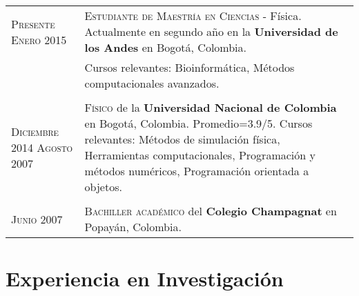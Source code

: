 \documentclass[a4paper,10pt]{article} %
\begin{document}
\begin{tabular}{p{2.7cm}p{12cm}}	
\textsc{Presente} \newline \textsc{Enero 2015} & \textsc{Estudiante de Maestría en Ciencias} - Física. Actualmente en segundo año en la \textbf{Universidad de los Andes} en Bogot\'a, Colombia. \\
& Cursos relevantes: Bioinformática, Métodos computacionales avanzados. \\
\\
\textsc{Diciembre 2014} \newline \textsc{Agosto 2007} & \textsc{Físico} de la \textbf{Universidad Nacional de Colombia} en Bogot\'a, Colombia. Promedio=3.9/5. Cursos relevantes: Métodos de simulación física,  
Herramientas computacionales, Programación y métodos numéricos,
Programación orientada a objetos. \\
\\
\textsc{Junio 2007}& \textsc{}\textsc{Bachiller académico} del \normalsize\textbf{Colegio Champagnat} en Popay\'an, Colombia.\\
\end{tabular}


\color{OrangeRed}
\section{Experiencia en Investigación}
\color{black}
\end{document}
